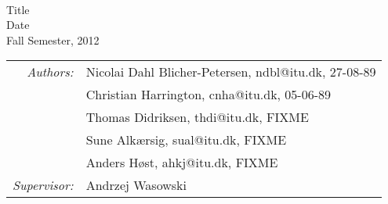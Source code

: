 \documentclass{llncs}
\begin{document}
\begin{titlepage}
\ \\
\vspace{3cm}
\begin{center}
{\huge\sffamily
Title
\\}\bigskip
{\large\sffamily
Date
\\}
{\sffamily Fall Semester, 2012}
\end{center}
\vspace{3cm}
\large
\begin{center}
\begin{tabular}{r@{  }l}
\emph{\sffamily Authors:} & \textsf{Nicolai Dahl Blicher-Petersen, ndbl@itu.dk, 27-08-89}\\
 & \textsf{Christian Harrington, cnha@itu.dk, 05-06-89}\\
 & \textsf{Thomas Didriksen, thdi@itu.dk, FIXME}\\
 & \textsf{Sune Alkærsig, sual@itu.dk, FIXME}\\
 & \textsf{Anders Høst, ahkj@itu.dk, FIXME}\\
\emph{\sffamily Supervisor:} & \textsf{Andrzej Wasowski}
\end{tabular}
\end{center}
\vfill
\end{titlepage}

%

\tableofcontents

\listoffigures



\end{document}
